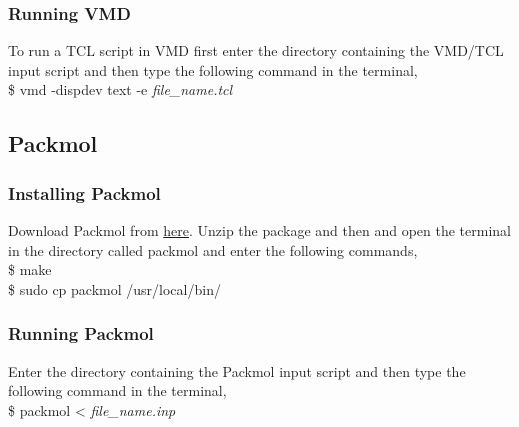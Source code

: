 \documentclass[12pt]{article}
\begin{document}
\newpage
\subsubsection{Running VMD}
To run a TCL script in VMD first enter the directory containing the VMD/TCL input script and 
then type the following command in the terminal,\\
\$ vmd -dispdev text -e \textit{file\_name.tcl}

\subsection{Packmol}

\subsubsection{Installing Packmol}

Download Packmol from \href{http://leandro.iqm.unicamp.br/m3g/packmol/download.shtml}{here}. 
Unzip the package and then and open the terminal in the directory called packmol
and enter the following commands,\\
\$ make \\
\$ sudo cp packmol /usr/local/bin/

\subsubsection{Running Packmol}
Enter the directory containing the Packmol input script and then type the 
following command in the terminal,\\
\$ packmol < \textit{file\_name.inp}





\end{document}
